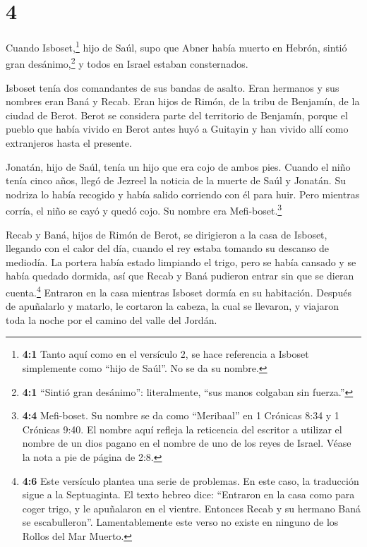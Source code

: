 \hypertarget{section-3}{%
\section{4}\label{section-3}}

 Cuando Isboset,\footnote{\textbf{4:1} Tanto aquí como en el
  versículo 2, se hace referencia a Isboset simplemente como ``hijo de
  Saúl''. No se da su nombre.} hijo de Saúl, supo que Abner había muerto
en Hebrón, sintió gran desánimo,\footnote{\textbf{4:1} ``Sintió gran
  desánimo'': literalmente, ``sus manos colgaban sin fuerza.''} y todos
en Israel estaban consternados.

 Isboset tenía dos comandantes de sus bandas de asalto. Eran
hermanos y sus nombres eran Baná y Recab. Eran hijos de Rimón, de la
tribu de Benjamín, de la ciudad de Berot. Berot se considera parte del
territorio de Benjamín,  porque el pueblo que había vivido
en Berot antes huyó a Guitayin y han vivido allí como extranjeros hasta
el presente.

 Jonatán, hijo de Saúl, tenía un hijo que era cojo de ambos
pies. Cuando el niño tenía cinco años, llegó de Jezreel la noticia de la
muerte de Saúl y Jonatán. Su nodriza lo había recogido y había salido
corriendo con él para huir. Pero mientras corría, el niño se cayó y
quedó cojo. Su nombre era Mefi-boset.\footnote{\textbf{4:4} Mefi-boset.
  Su nombre se da como ``Meribaal'' en 1 Crónicas 8:34 y 1 Crónicas
  9:40. El nombre aquí refleja la reticencia del escritor a utilizar el
  nombre de un dios pagano en el nombre de uno de los reyes de Israel.
  Véase la nota a pie de página de 2:8.}

 Recab y Baná, hijos de Rimón de Berot, se dirigieron a la
casa de Isboset, llegando con el calor del día, cuando el rey estaba
tomando su descanso de mediodía.  La portera había estado
limpiando el trigo, pero se había cansado y se había quedado dormida,
así que Recab y Baná pudieron entrar sin que se dieran
cuenta.\footnote{\textbf{4:6} Este versículo plantea una serie de
  problemas. En este caso, la traducción sigue a la Septuaginta. El
  texto hebreo dice: ``Entraron en la casa como para coger trigo, y le
  apuñalaron en el vientre. Entonces Recab y su hermano Baná se
  escabulleron''. Lamentablemente este verso no existe en ninguno de los
  Rollos del Mar Muerto.}  Entraron en la casa mientras
Isboset dormía en su habitación. Después de apuñalarlo y matarlo, le
cortaron la cabeza, la cual se llevaron, y viajaron toda la noche por el
camino del valle del Jordán.

